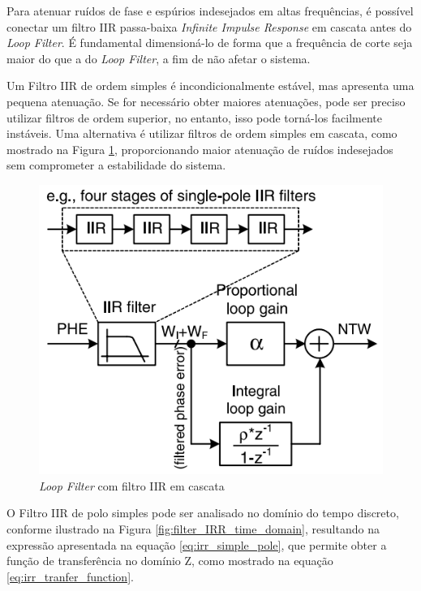 Para atenuar ruídos de fase e espúrios indesejados em altas frequências, é possível conectar um filtro IIR passa-baixa \textit{Infinite Impulse Response} em cascata antes do \textit{Loop Filter}. É fundamental dimensioná-lo de forma que a frequência de corte seja maior do que a do \textit{Loop Filter}, a fim de não afetar o sistema.

Um Filtro IIR de ordem simples é incondicionalmente estável, mas apresenta uma pequena atenuação. Se for necessário obter maiores atenuações, pode ser preciso utilizar filtros de ordem superior, no entanto, isso pode torná-los facilmente instáveis. Uma alternativa é utilizar filtros de ordem simples em cascata, como mostrado na Figura \ref{fig:filter_IRR}, proporcionando maior atenuação de ruídos indesejados sem comprometer a estabilidade do sistema.
 
\begin{figure}[htb]
	\caption{\textit{Loop Filter} com filtro IIR em cascata}
	\begin{center}
		\includegraphics[scale=0.8]{img/filter_IRR.png}
	\end{center}
	\label{fig:filter_IRR}
\end{figure}

 O Filtro IIR de polo simples pode ser analisado no domínio do tempo discreto, conforme ilustrado na Figura \ref{fig:filter_IRR_time_domain}, resultando na expressão apresentada na equação \ref{eq:irr_simple_pole}, que permite obter a função de transferência no domínio Z, como mostrado na equação \ref{eq:irr_tranfer_function}.

